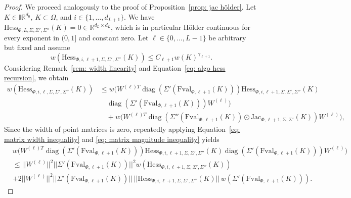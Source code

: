 \documentclass[a4paper, 11pt]{article}
\begin{document}
	\begin{proof}
		We proceed analogously to the proof of Proposition~\ref{prop: jac hölder}. Let $K\in \mathbb{IR}^{d_0}, \, K \subset \Omega$, and $i \in \{1, \dotsc, d_{L+1}\}$. We have $\mathrm{Hess}_{\Phi,L, \Sigma, \Sigma', \Sigma''}(K)=0 \in \mathbb{R}^{d_L \times d_L}$, which is in particular Hölder continuous for every exponent in $(0,1]$ and constant zero. Let $\ell \in \{0, \dotsc,L-1\}$ be arbitrary but fixed and assume
		\begin{equation}\label{eq: hess hölder induction hypothesis}
			w(\mathrm{Hess}_{\Phi,i,\ell+1, \Sigma, \Sigma', \Sigma''}(K)) \leq C_{\ell+1} w(K)^{\gamma_{\ell+1}}.
		\end{equation}
		Considering Remark~\ref{rem: width linearity} and Equation~\eqref{eq: algo hess recursion}, we obtain
		\begin{equation*}
			\begin{aligned}
				w(\mathrm{Hess}_{\Phi, i,{\ell}, \Sigma, \Sigma', \Sigma''}({K}))
				&\leq w\bigg(W^{({\ell})T} \operatorname{diag}\left( \Sigma'(\mathrm{Fval}_{\Phi, {\ell}+1}({K}))\right)  \mathrm{Hess}_{\Phi, i,{\ell}+1, \Sigma, \Sigma', \Sigma''}({K}) \\
				&\quad  \operatorname{diag}\left( \Sigma'(\mathrm{Fval}_{\Phi, {\ell}+1}({K}))\right) W^{({\ell})}\bigg)\\
				&\quad + w\bigg(W^{({\ell})T} \operatorname{diag}\left(\Sigma'' (\mathrm{Fval}_{\Phi, {\ell}+1}({K})) \odot \mathrm{Jac}_{\Phi, {\ell}+1, \Sigma, \Sigma'}({K})\right)  W^{({\ell})}\bigg),
			\end{aligned}
		\end{equation*}
		Since the width of point matrices is zero, repeatedly applying Equation~\eqref{eq: matrix width inequality} and \eqref{eq: matrix magnitude inequality} yields
		\begin{equation*}
			\begin{aligned}
				& w\bigg(W^{({\ell})T} \operatorname{diag}\left( \Sigma'(\mathrm{Fval}_{\Phi, {\ell}+1}({K}))\right)  \mathrm{Hess}_{\Phi, i,{\ell}+1, \Sigma, \Sigma', \Sigma''}({K}) 
				\operatorname{diag}\left( \Sigma'(\mathrm{Fval}_{\Phi, {\ell}+1}({K}))\right) W^{({\ell})}\bigg) \\
				&\leq ||W^{({\ell})}||^2 ||\Sigma'(\mathrm{Fval}_{\Phi, {\ell}+1}({K}))||^2 w(\mathrm{Hess}_{\Phi, i,{\ell}+1, \Sigma, \Sigma', \Sigma''}({K})) \\
				&+ 2 ||W^{({\ell})}||^2 ||\Sigma'(\mathrm{Fval}_{\Phi, {\ell}+1}({K}))|| \,||\mathrm{Hess}_{\Phi, i,{\ell}+1, \Sigma, \Sigma', \Sigma''}({K}) ||\, w(\Sigma' (\mathrm{Fval}_{\Phi, {\ell}+1}({K}))).

\end{aligned}
\end{equation*}
\end{proof}
\end{document}
